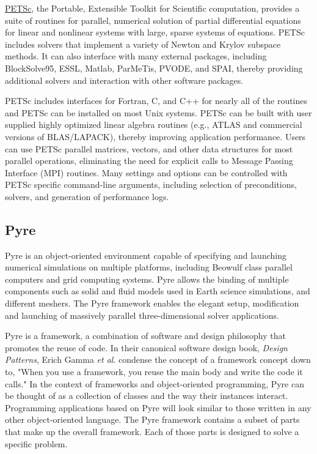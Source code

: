 \href{http://www-unix.mcs.anl.gov/petsc/petsc-as/}{PETSc}, the
Portable, Extensible Toolkit for Scientific computation, provides a
suite of routines for parallel, numerical solution of partial
differential equations for linear and nonlinear systems with large,
sparse systems of equations. PETSc includes solvers that implement a
variety of Newton and Krylov subspace methods. It can also interface
with many external packages, including BlockSolve95, ESSL, Matlab,
ParMeTis, PVODE, and SPAI, thereby providing additional solvers and
interaction with other software packages.

PETSc includes interfaces for Fortran, C, and C++ for nearly all of
the routines and PETSc can be installed on most Unix systems. PETSc
can be built with user supplied highly optimized linear algebra
routines (e.g., ATLAS and commercial versions of BLAS/LAPACK), thereby
improving application performance. Users can use PETSc parallel
matrices, vectors, and other data structures for most parallel
operations, eliminating the need for explicit calls to Message Passing
Interface (MPI) routines. Many settings and options can be controlled
with PETSc specific command-line arguments, including selection of
preconditions, solvers, and generation of performance logs.

\subsection{Pyre}

Pyre is an object-oriented environment capable of specifying and
launching numerical simulations on multiple platforms, including
Beowulf class parallel computers and grid computing systems. Pyre
allows the binding of multiple components such as solid and fluid
models used in Earth science simulations, and different meshers. The
Pyre framework enables the elegant setup, modification and launching
of massively parallel three-dimensional solver applications.

Pyre is a framework, a combination of software and design philosophy
that promotes the reuse of code. In their canonical software design
book, {\em Design Patterns}, Erich Gamma {\it et al}.  condense the
concept of a framework concept down to, "When you use a framework, you
reuse the main body and write the code it calls." In the context of
frameworks and object-oriented programming, Pyre can be thought of as
a collection of classes and the way their instances interact.
Programming applications based on Pyre will look similar to those
written in any other object-oriented language. The Pyre framework
contains a subset of parts that make up the overall framework. Each of
those parts is designed to solve a specific problem.

